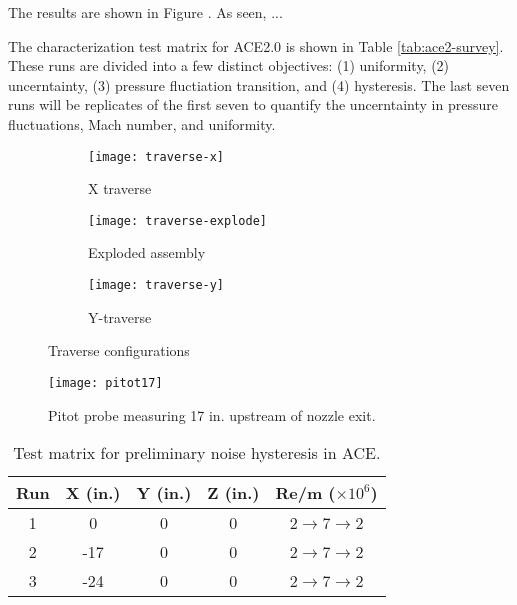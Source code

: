 The results are shown in Figure . As seen, ...

The characterization test matrix for ACE2.0 is shown in Table \ref{tab:ace2-survey}. These runs are divided into a few distinct objectives: (1) uniformity, (2) uncerntainty, (3) pressure fluctiation transition, and (4) hysteresis. The last seven runs will be replicates of the first seven to quantify the uncerntainty in pressure fluctuations, Mach number, and uniformity.

\begin{figure}[ht]
    \centering
    \begin{subfigure}[b]{0.4\textwidth}
            \texttt{[image: traverse-x]}
        \caption{X traverse}
        \label{fig:traverse-x}
    \end{subfigure}
    \begin{subfigure}[b]{0.22\textwidth}
            \texttt{[image: traverse-explode]}
        \caption{Exploded assembly}
        \label{fig:traverse-explode}
    \end{subfigure}
    \begin{subfigure}[b]{0.35\textwidth}
            \texttt{[image: traverse-y]}
        \caption{Y-traverse}
        \label{fig:traverse-y}
    \end{subfigure}
    \caption{Traverse configurations}
    \label{fig:traverse}
\end{figure}

\begin{figure}[ht]
    \centering
    \texttt{[image: pitot17]}
    \caption{Pitot probe measuring 17 in. upstream of nozzle exit.}
    \label{fig:pitot17}
\end{figure}

\begin{table}[ht]
    \centering
    \begin{tabular}{|c|c|c|c|c|}
        \hline
    \textbf{Run} & \textbf{X (in.)} & \textbf{Y (in.)} & \textbf{Z (in.)} & \textbf{Re/m ($\times10^6$)} \\ \hline
        1 & 0 & 0 & 0 & 2$\to$7$\to$2 \\ \hline
        2 & -17 & 0 & 0 & 2$\to$7$\to$2 \\ \hline
        3 & -24 & 0 & 0 & 2$\to$7$\to$2 \\ \hline
    \end{tabular}
    \caption{Test matrix for preliminary noise hysteresis in ACE.}
    \label{tab:ace-survey}
\end{table}

